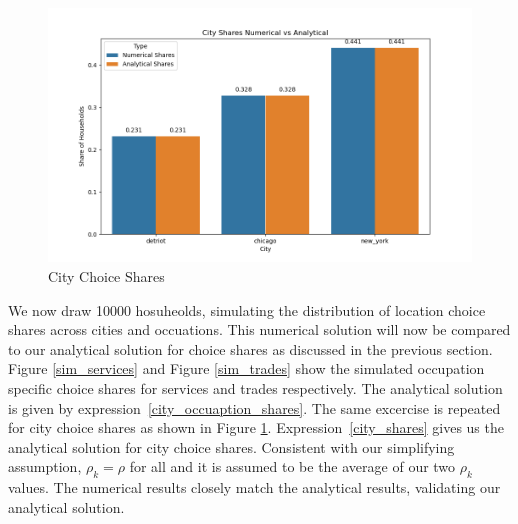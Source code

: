 \documentclass[10pt]{article}
\begin{document}
\begin{figure}[!htb]
    \centering
    \includegraphics[width=\textwidth]{../../simulations/graphs/sim_city_shares.png}
    \caption{City Choice Shares}
    \label{sim_city_shares}
\end{figure}

We now draw 10000 hosuheolds, simulating the distribution of location choice shares across cities and occuations. This numerical solution will now be compared to our analytical solution for choice shares as discussed in the previous section. Figure \ref{sim_services} and Figure \ref{sim_trades} show the simulated occupation specific choice shares for services and trades respectively. The analytical solution is given by expression~\ref{city_occuaption_shares}. The same excercise is repeated for city choice shares as shown in Figure \ref{sim_city_shares}. Expression~\ref{city_shares} gives us the analytical solution for city choice shares. Consistent with our simplifying assumption, $\rho_k = \rho$ for all and it is assumed to be the average of our two $\rho_k$ values. The numerical results closely match the analytical results, validating our analytical solution.
\end{document}
